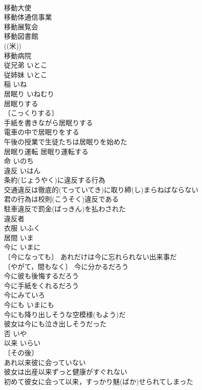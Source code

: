 \documentclass[8pt]{extreport}
\begin{document}
\begin{CJK}{UTF8}{min}
\\	移動大使 
\\	移動体通信事業 
\\	移動展覧会 
\\	移動図書館 
\\	((米)) 
\\	移動病院 
\\	従兄弟	いとこ	
\\	従姉妹	いとこ	
\\	稲	いね	
\\	居眠り	いねむり	
\\	居眠りする 
\\	〔こっくりする〕
\\	手紙を書きながら居眠りする 
\\	電車の中で居眠りをする 
\\	午後の授業で生徒たちは居眠りを始めた 
\\	居眠り運転 居眠り運転する 
\\	命	いのち	
\\	違反	いはん	
\\	条約(じょうやく)に違反する行為 
\\	交通違反は徹底的(てっていてき)に取り締(し)まらねばならない 
\\	君の行為は校則(こうそく)違反である 
\\	駐車違反で罰金(ばっきん)を払わされた 
\\	違反者 
\\	衣服	いふく	
\\	居間	いま	
\\	今に	いまに	
\\	〔今になっても〕 あれだけは今に忘れられない出来事だ 
\\	〔やがて，間もなく〕 今に分かるだろう 
\\	今に彼も後悔するだろう 
\\	今に手紙をくれるだろう 
\\	今にみていろ 
\\	今にも	いまにも	
\\	今にも降り出しそうな空模様(もよう)だ 
\\	彼女は今にも泣き出しそうだった 
\\	否	いや	
\\	以来	いらい	
\\	〔その後〕
\\	あれ以来彼に会っていない 
\\	彼女は出産以来ずっと健康がすぐれない 
\\	初めて彼女に会って以来，すっかり魅(ばか)せられてしまった 

\end{CJK}
\end{document}
